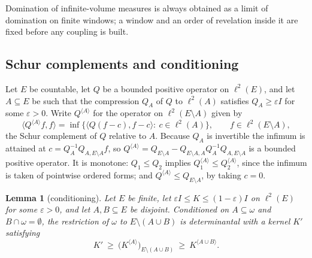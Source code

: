 \documentclass[11pt]{amsart}
\newtheorem{lemma}[proposition]{Lemma}
\theoremstyle{remark}
\theoremstyle{definition}
\newcommand{\ltwo}{\ell^2}
\begin{document}
Domination of infinite-volume measures is always obtained as a limit of domination on finite windows; a window and an
order of revelation inside it are fixed before any coupling is built.

\subsection*{Schur complements and conditioning}
Let $E$ be countable, let $Q$ be a bounded positive operator on $\ltwo(E)$, and let $A\subseteq E$ be such that the
compression $Q_A$ of $Q$ to $\ltwo(A)$ satisfies $Q_A\ge\varepsilon I$ for some $\varepsilon>0$. Write
$Q^{\langle A\rangle}$ for the operator on $\ltwo(E\setminus A)$ given by
\[
\langle Q^{\langle A\rangle}f,f\rangle=\inf\bigl\{\langle Q(f-c),f-c\rangle:\ c\in\ltwo(A)\bigr\},\qquad
f\in\ltwo(E\setminus A),
\]
the Schur complement of $Q$ relative to $A$. Because $Q_A$ is invertible the infimum is attained at
$c=Q_A^{-1}Q_{A,E\setminus A}f$, so $Q^{\langle A\rangle}=Q_{E\setminus A}-Q_{E\setminus A,A}Q_A^{-1}Q_{A,E\setminus A}$ is a
bounded positive operator. It is monotone: $Q_1\le Q_2$ implies $Q_1^{\langle A\rangle}\le Q_2^{\langle A\rangle}$, since
the infimum is taken of pointwise ordered forms; and $Q^{\langle A\rangle}\le Q_{E\setminus A}$, by taking $c=0$.

\begin{lemma}[conditioning]\label{lem:cond}
Let $E$ be finite, let $\varepsilon I\le K\le(1-\varepsilon)I$ on $\ltwo(E)$ for some $\varepsilon>0$, and let
$A,B\subseteq E$ be disjoint. Conditioned on $A\subseteq\omega$ and $B\cap\omega=\emptyset$, the restriction of $\omega$ to
$E\setminus(A\cup B)$ is determinantal with a kernel $K'$ satisfying
\[
K'\ \ge\ \bigl(K^{\langle A\rangle}\bigr)_{E\setminus(A\cup B)}\ \ge\ K^{\langle A\cup B\rangle}.
\]
\end{lemma}
\end{document}
